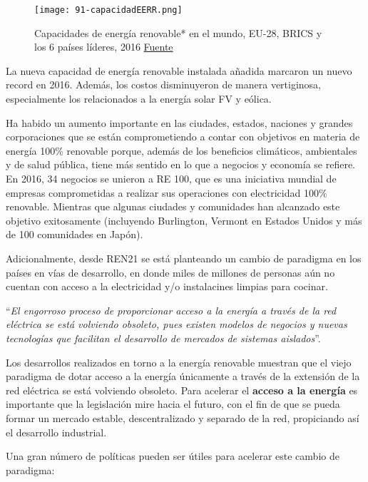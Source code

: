 \begin{figure}
\centering
\texttt{[image: 91-capacidadEERR.png]}
\caption[Capacidades de energía renovable* en el mundo]{Capacidades de energía renovable* en el mundo, EU-28, BRICS y los 6 países líderes, 2016 \href{http://www.ren21.net/wp-content/uploads/2017/07/17-8399_GSR_2017_KEY-FINDINGS_Spanish_lowres.pdf}{Fuente}}
\label{fig:capacidadeerr}
\end{figure}

La nueva capacidad de energía renovable instalada añadida marcaron un
nuevo record en 2016. Además, los costos disminuyeron de manera
vertiginosa, especialmente los relacionados a la energía solar FV y
eólica.

Ha habido un aumento importante en las ciudades, estados, naciones y
grandes corporaciones que se están comprometiendo a contar con objetivos
en materia de energía 100\% renovable porque, además de los beneficios
climáticos, ambientales y de salud pública, tiene más sentido en lo que
a negocios y economía se refiere. En 2016, 34 negocios se unieron a RE
100, que es una iniciativa mundial de empresas comprometidas a realizar
sus operaciones con electricidad 100\% renovable. Mientras que algunas
ciudades y comunidades han alcanzado este objetivo exitosamente
(incluyendo Burlington, Vermont en Estados Unidos y más de 100
comunidades en Japón).

Adicionalmente, desde REN21 se está planteando un cambio de paradigma en
los países en vías de desarrollo, en donde miles de millones de personas
aún no cuentan con acceso a la electricidad y/o instalacines limpias
para cocinar.

``\emph{El engorroso proceso de proporcionar acceso a la energía a través
de la red eléctrica se está volviendo obsoleto, pues existen modelos de
negocios y nuevas tecnologías que facilitan el desarrollo de mercados de
sistemas aislados}''.

Los desarrollos realizados en torno a la energía renovable muestran que
el viejo paradigma de dotar acceso a la energía únicamente a través de
la extensión de la red eléctrica se está volviendo obsoleto. Para
acelerar el \textbf{acceso a la energía} es importante que la
legislación mire hacia el futuro, con el fin de que se pueda formar un
mercado estable, descentralizado y separado de la red, propiciando así
el desarrollo industrial.

Una gran número de políticas pueden ser útiles para acelerar este cambio
de paradigma:

